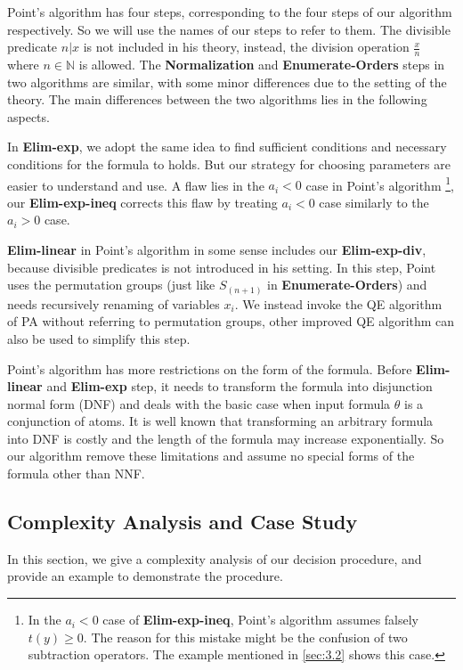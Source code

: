 Point's algorithm \cite{Point86} has four steps,
corresponding to the four steps of our algorithm respectively.
So we will use the names of our steps to refer to them. 
The divisible predicate $n|x$ is not included in his theory,
instead, the division operation $\frac{x}{n}$ where $n\in \mathbb{N}$ is allowed.
The \textbf{Normalization} and \textbf{Enumerate-Orders} steps in two algorithms are similar,
with some minor differences due to the setting of the theory.
The main differences between the two algorithms lies in the following aspects.

In \textbf{Elim-exp},
we adopt the same idea to find sufficient conditions
and necessary conditions for the formula to holds.
But our strategy for choosing parameters are easier to understand and use.
A flaw lies in the $a_i<0$ case in Point's algorithm 
\footnote{
In the $a_i<0$ case of \textbf{Elim-exp-ineq},
Point's algorithm assumes falsely $t(y)\ge 0$.
The reason for this mistake might be the confusion of 
two subtraction operators.
The example mentioned in \ref{sec:3.2} shows this case.
},
our \textbf{Elim-exp-ineq} corrects this flaw by 
treating $a_i<0$ case similarly to the $a_i>0$ case.

\textbf{Elim-linear} in Point's algorithm in some sense includes our
\textbf{Elim-exp-div}, because divisible predicates is not introduced in his setting.
In this step,
Point uses the permutation groups (just like $S_{(n+1)}$ in \textbf{Enumerate-Orders}) and needs recursively renaming of variables $x_i$.
We instead invoke the QE algorithm of PA without referring to permutation groups, 
other improved QE algorithm can also be used to simplify this step.

Point's algorithm has more restrictions on the form
of the formula.
Before \textbf{Elim-linear} and \textbf{Elim-exp} step,
it needs to transform the formula into disjunction normal form (DNF)
and deals with the basic case when input formula $\theta$ is 
a conjunction of atoms. 
It is well known that transforming an arbitrary formula into 
DNF is costly and the length of the formula may increase exponentially.
So our algorithm remove these limitations and assume no special forms of
the formula other than NNF.





\iffalse
\subsection{Complexity Analysis and Case Study}
In this section, we give a complexity analysis of our decision procedure, and provide an example to demonstrate the procedure.

